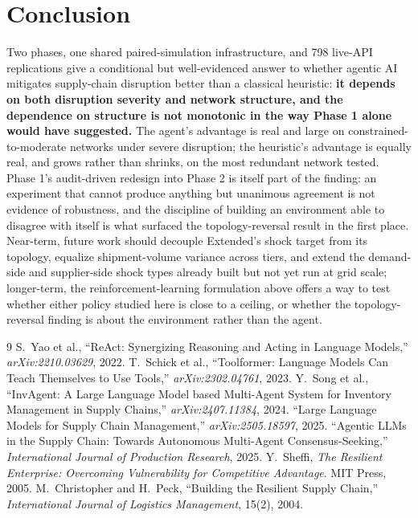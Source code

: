\documentclass[10pt,twocolumn]{article}
\begin{document}
\section{Conclusion}
Two phases, one shared paired-simulation infrastructure, and 798 live-API replications give a conditional but well-evidenced answer to whether agentic AI mitigates supply-chain disruption better than a classical heuristic: \textbf{it depends on both disruption severity and network structure, and the dependence on structure is not monotonic in the way Phase 1 alone would have suggested.} The agent's advantage is real and large on constrained-to-moderate networks under severe disruption; the heuristic's advantage is equally real, and grows rather than shrinks, on the most redundant network tested. Phase 1's audit-driven redesign into Phase 2 is itself part of the finding: an experiment that cannot produce anything but unanimous agreement is not evidence of robustness, and the discipline of building an environment able to disagree with itself is what surfaced the topology-reversal result in the first place. Near-term, future work should decouple Extended's shock target from its topology, equalize shipment-volume variance across tiers, and extend the demand-side and supplier-side shock types already built but not yet run at grid scale; longer-term, the reinforcement-learning formulation above offers a way to test whether either policy studied here is close to a ceiling, or whether the topology-reversal finding is about the environment rather than the agent.

\begin{thebibliography}{9}
\footnotesize
{} S.~Yao et al., ``ReAct: Synergizing Reasoning and Acting in Language Models,'' \emph{arXiv:2210.03629}, 2022.
 T.~Schick et al., ``Toolformer: Language Models Can Teach Themselves to Use Tools,'' \emph{arXiv:2302.04761}, 2023.
 Y.~Song et al., ``InvAgent: A Large Language Model based Multi-Agent System for Inventory Management in Supply Chains,'' \emph{arXiv:2407.11384}, 2024.
 ``Large Language Models for Supply Chain Management,'' \emph{arXiv:2505.18597}, 2025.
 ``Agentic LLMs in the Supply Chain: Towards Autonomous Multi-Agent Consensus-Seeking,'' \emph{International Journal of Production Research}, 2025.
 Y.~Sheffi, \emph{The Resilient Enterprise: Overcoming Vulnerability for Competitive Advantage}. MIT Press, 2005.
 M.~Christopher and H.~Peck, ``Building the Resilient Supply Chain,'' \emph{International Journal of Logistics Management}, 15(2), 2004.
\end{thebibliography}
\end{document}
